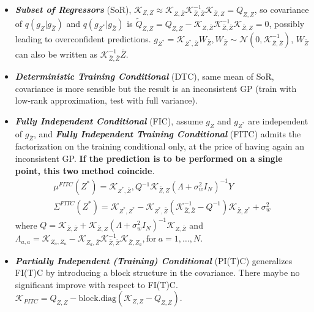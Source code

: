\documentclass[10pt]{elegantbook}
\newcommand{\mydefination}[1]{\textbf{\textit{\textcolor{structurecolor}{#1}}}}
\begin{document}
\begin{itemize}
    \item \mydefination{Subset of Regressors} (SoR), $\mathscr{K}_{Z, Z} \approx \mathscr{K}_{Z, \bar Z}\mathscr{K}_{\bar Z, \bar Z}^{-1}\mathscr{K}_{\bar Z, Z} = Q_{Z, Z}$,
so covariance of $q(g_{Z}|g_{\bar Z})$ and $q(g_{Z^{*}}|g_{\bar Z})$ is $\tilde Q_{Z, Z} = Q_{Z, Z} - \mathscr{K}_{Z, \bar Z}\mathscr{K}_{\bar Z, \bar Z}^{-1}\mathscr{K}_{\bar Z, Z}= 0$, 
possibly leading to overconfident predictions. $g_{Z^{*}} = \mathscr{K}_{Z^*, \bar Z} W_{\bar Z}, W_{\bar Z} \sim \mathcal N(0, \mathscr{K}_{\bar Z, \bar Z}^{-1})$, 
$W_{\bar Z}$ can also be written as $\mathscr{K}_{\bar Z, \bar Z}^{-1} \bar Z$.
    \item \mydefination{Deterministic Training Conditional} (DTC), same mean of SoR, covariance is more sensible but the result 
is an inconsistent GP (train with low-rank approximation, test with full variance).
    \item \mydefination{Fully Independent Conditional} (FIC), assume $g_{Z}$ and $g_{Z^{*}}$ are independent of $g_{\bar Z}$,
and \mydefination{Fully Independent Training Conditional} (FITC) admits the factorization on the training conditional only, at the price of having again an inconsistent
GP. \textbf{If the prediction is to be performed on a single point, this two method coincide}.
\begin{equation}
    \begin{array}{l}
        {\mu}^{F I T C}(Z^{*})=\mathscr{K}_{Z^{*}, \bar{Z}},{Q}{}^{-1}\mathscr{K}_{\bar{Z},Z}(\Lambda+\sigma_{w}^{2}I_{N})^{-1}Y \\ 
        \Sigma^{F I T C}(Z^{*})=\mathscr{K}_{Z^{*}, Z^{*}}-\mathscr{K}_{Z^{*}, \bar{Z}}(\mathscr{K}^{-1}_{\bar{{{Z}}},\bar{{{Z}}}}-Q^{-1})\mathscr{K}_{\bar{{{Z}}},Z^{*}}+\sigma_{w}^{2}
    \end{array}
\end{equation}
where $Q = \mathscr{K}_{\bar{Z}, \bar Z} + \mathscr{K}_{\bar{Z},Z}(\Lambda+\sigma_{w}^{2}I_{N})^{-1}\mathscr{K}_{Z, \bar Z}$ and 
$\Lambda_{a, a} = \mathscr{K}_{Z_a, Z_a} - \mathscr{K}_{Z_a, \bar Z} \mathscr{K}_{\bar{Z}, \bar Z}^{-1} \mathscr{K}_{\bar Z, Z_a}, \text{for} ~ a = 1, \ldots, N$.
    \item \mydefination{Partially Independent (Training) Conditional} (PI(T)C) generalizes FI(T)C by
introducing a block structure in the covariance. There maybe no significant improve with respect to FI(T)C.
$\mathscr{K}_{PITC} = Q_{Z, Z} - \text{block.diag}(\mathscr{K}_{Z, Z} - Q_{Z, Z})$.
\end{itemize}
\end{document}

